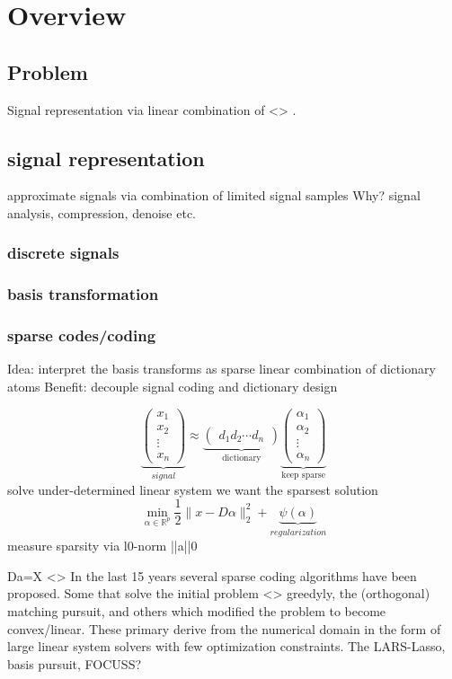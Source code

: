 \chapter{Overview}

\section{Problem}
Signal representation via linear combination of <> .
\section{signal representation}
approximate signals via combination of limited signal samples
Why?
signal analysis, compression, denoise etc.
\subsection{discrete signals}
\subsection{basis transformation}
\subsection{sparse codes/coding}
Idea: interpret the basis transforms as sparse linear combination of dictionary atoms
Benefit: decouple signal coding and dictionary design

\[
\underbrace{\begin{pmatrix} x_1 \\ x_2 \\ \vdots \\ x_n \end{pmatrix}}_{signal} \approx \underbrace{\begin{pmatrix} d_1  d_2 \cdots d_n \end{pmatrix}}_{\textrm{dictionary}}
\underbrace{\begin{pmatrix} \alpha_1 \\ \alpha_2 \\ \vdots \\ \alpha_n \end{pmatrix}}_{\textrm{keep sparse}}
\]
solve under-determined linear system
we want the sparsest solution
\[
\min_{\alpha\in\mathbb{R}^{p}} \frac{1}{2} \lVert x - D\alpha \rVert^{2}_{2} + \underbrace{\psi(\alpha)}_{regularization}
\] 
measure sparsity via       l0-norm       ||a||0

Da=X
<>
In the last 15 years several sparse coding algorithms have been proposed. Some that solve the initial problem <> greedyly, the (orthogonal) matching pursuit, and others which modified the problem to become convex/linear. These primary derive from the numerical domain in the form of 
large linear system solvers with few optimization constraints. The LARS-Lasso, basis pursuit, FOCUSS?


